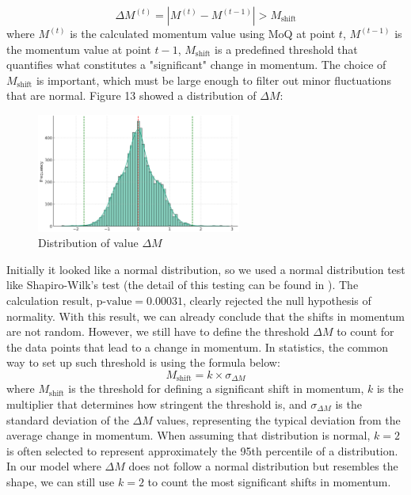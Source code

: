 \documentclass[12pt]{article}  %
\begin{document}
\[ \Delta M^{(t)} = | M^{(t)} - M^{(t-1)} | > M_{\text{shift}} \]
where \( M^{(t)} \) is the calculated momentum value using MoQ at point \( t \), \( M^{(t-1)} \) is the momentum value at point \( t-1 \), \( M_{\text{shift}} \) is a predefined threshold that quantifies what constitutes a "significant" change in momentum. The choice of \( M_{\text{shift}} \) is important, which must be large enough to filter out minor fluctuations that are normal. Figure 13 showed a distribution of $\Delta M$:

 \begin{figure}[htbp]  %
 	\centering  %
 	\includegraphics[width=0.6\textwidth]{range.png} %
 	\caption{Distribution of value $\Delta M$} %
 \end{figure}
 \vspace{-0.2cm}
 
Initially it looked like a normal distribution, so we used a normal distribution test like Shapiro-Wilk's test (the detail of this testing can be found in \cite{15}). The calculation result, $\text{p-value} = 0.00031$, clearly rejected the null hypothesis of normality. With this result, we can already conclude that the shifts in momentum are not random. However, we still have to define the threshold $\Delta M$ to count for the data points that lead to a change in momentum. In statistics, the common way to set up such threshold is using the formula below:
\[ M_{\text{shift}} = k \times \sigma_{\Delta M} \]
where \( M_{\text{shift}} \) is the threshold for defining a significant shift in momentum, \( k \) is the multiplier that determines how stringent the threshold is, and \( \sigma_{\Delta M} \) is the standard deviation of the \( \Delta M \) values, representing the typical deviation from the average change in momentum. When assuming that distribution is normal, \( k = 2 \) is often selected to represent approximately the 95th percentile of a distribution. In our model where $\Delta M$ does not follow a normal distribution but resembles the shape, we can still use \( k = 2 \) to count the most significant shifts in momentum.
\end{document}
